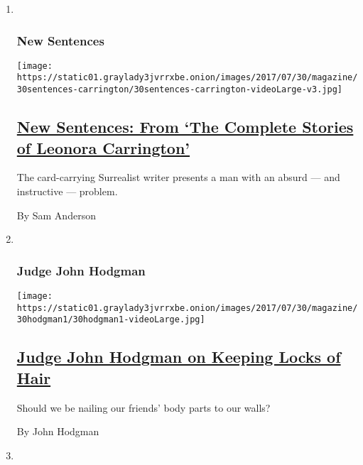 \begin{enumerate}
\def\labelenumi{\arabic{enumi}.}
\item ~
  \hypertarget{new-sentences}{%
  \subsubsection{New Sentences}\label{new-sentences}}

  \texttt{[image: https://static01.graylady3jvrrxbe.onion/images/2017/07/30/magazine/30sentences-carrington/30sentences-carrington-videoLarge-v3.jpg]}

  \hypertarget{new-sentences-from-the-complete-stories-of-leonora-carrington}{%
  \subsection{\texorpdfstring{\href{/2017/07/28/magazine/new-sentences-from-the-complete-stories-of-leonora-carrington.html}{New
  Sentences: From `The Complete Stories of Leonora
  Carrington'}}{New Sentences: From `The Complete Stories of Leonora Carrington'}}\label{new-sentences-from-the-complete-stories-of-leonora-carrington}}

  The card-carrying Surrealist writer presents a man with an absurd ---
  and instructive --- problem.

  By Sam Anderson
\item ~
  \hypertarget{judge-john-hodgman}{%
  \subsubsection{Judge John Hodgman}\label{judge-john-hodgman}}

  \texttt{[image: https://static01.graylady3jvrrxbe.onion/images/2017/07/30/magazine/30hodgman1/30hodgman1-videoLarge.jpg]}

  \hypertarget{judge-john-hodgman-on-keeping-locks-of-hair}{%
  \subsection{\texorpdfstring{\href{/2017/07/28/magazine/judge-john-hodgman-on-keeping-locks-of-hair.html}{Judge
  John Hodgman on Keeping Locks of
  Hair}}{Judge John Hodgman on Keeping Locks of Hair}}\label{judge-john-hodgman-on-keeping-locks-of-hair}}

  Should we be nailing our friends' body parts to our walls?

  By John Hodgman
\item ~
  \hypertarget{tip}{%
}
\end{enumerate}
